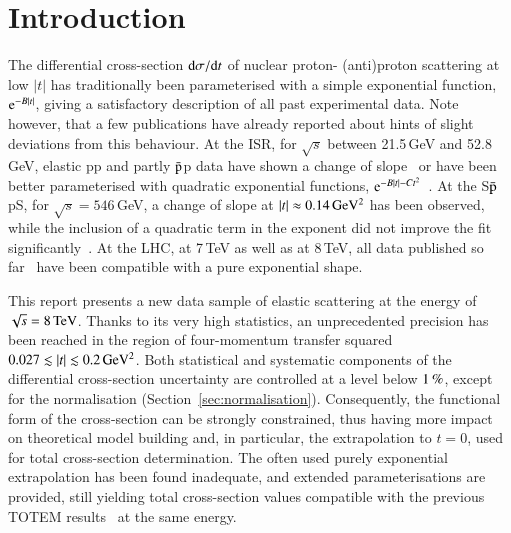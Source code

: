 \section{Introduction}
%
The differential cross-section ${\rm d} \sigma/{\rm d} t$ of nuclear proton-%
(anti)proton 
scattering at low $|t|$ has traditionally been parameterised with a simple 
exponential function, ${\rm e}^{-B |t|}$, giving a satisfactory description of 
all past experimental data.
Note however, that
a few publications have already reported about hints of
slight deviations from this behaviour. At the ISR, for $\sqrt{s}$ 
between 21.5\,GeV and 52.8\,GeV, elastic pp and partly $\rm\bar{p}$p data have shown a 
change of slope~\cite{plb39,plb115} or have been better parameterised with quadratic 
exponential functions, ${\rm e}^{-B |t|-C t^2}$~\cite{npb141,npb248}. 
At the S$\rm\bar{p}$pS, for 
$\sqrt{s} = 546\,$GeV, a change of slope at $|t| \approx 0.14\,\rm GeV^{2}$ 
has been observed, while the inclusion of a quadratic term in the exponent did
not improve the fit significantly~\cite{plb147}.
At the LHC, at 7\,TeV as well as at 8\,TeV, all data published so 
far~\cite{epl96,epl101-el,prl111,alfa} have been
compatible with a pure exponential shape.

This report presents a new data sample of elastic scattering at the energy of $\sqrt s = 8\,{\rm TeV}$. Thanks to its very high statistics,
an unprecedented precision has been reached in the region of four-momentum transfer squared $0.027 \lesssim |t| \lesssim 0.2\,{\rm GeV^2}$. Both statistical and systematic components of the differential cross-section uncertainty are controlled 
at a level below $1\,{\rm \%}$, except for the normalisation 
(Section~\ref{sec:normalisation}). Consequently, the functional form of the cross-section can be strongly constrained, thus having more impact on theoretical model building and, in particular, the extrapolation to $t=0$, used for total cross-section determination. The often used purely exponential extrapolation has been found inadequate, and extended parameterisations are provided, still yielding total cross-section values compatible with the previous TOTEM results~\cite{prl111} at the same energy.
